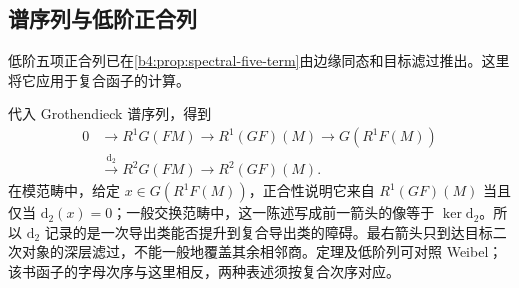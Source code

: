 \subsection{谱序列与低阶正合列}
\label{b4:subsec:1503:03}

低阶五项正合列已在\cref{b4:prop:spectral-five-term}由边缘同态和目标滤过推出。这里将它应用于复合函子的计算。

代入 Grothendieck 谱序列，得到
\[
	\begin{aligned}
		0&\longrightarrow R^1G(FM)\longrightarrow R^1(GF)(M) \longrightarrow G(R^1F(M))\\
		&\xrightarrow{\mathrm{d}_2}R^2G(FM)\longrightarrow R^2(GF)(M).
	\end{aligned}
\]
在模范畴中，给定 \(x\in G(R^1F(M))\)，正合性说明它来自 \(R^1(GF)(M)\) 当且仅当 \(\mathrm d_2(x)=0\)；一般交换范畴中，这一陈述写成前一箭头的像等于 \(\ker\mathrm d_2\)。所以 \(\mathrm d_2\) 记录的是一次导出类能否提升到复合导出类的障碍。最右箭头只到达目标二次对象的深层滤过，不能一般地覆盖其余相邻商。定理及低阶列可对照 Weibel\cite[Cohomological Setup 5.8.1, Grothendieck Spectral Sequence Theorem 5.8.3]{Weibel1994HomologicalAlgebra}；该书函子的字母次序与这里相反，两种表述须按复合次序对应。
